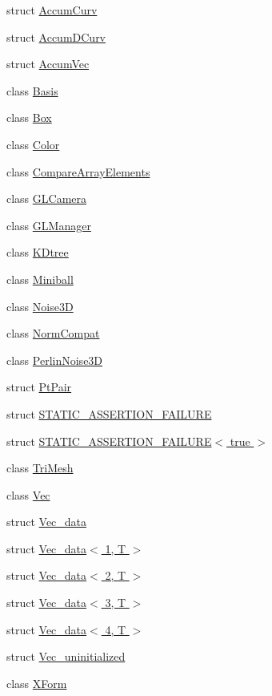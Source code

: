 \begin{DoxyCompactItemize}
\item 
struct \hyperlink{structtrimesh_1_1AccumCurv}{Accum\+Curv}
\item 
struct \hyperlink{structtrimesh_1_1AccumDCurv}{Accum\+D\+Curv}
\item 
struct \hyperlink{structtrimesh_1_1AccumVec}{Accum\+Vec}
\item 
class \hyperlink{classtrimesh_1_1Basis}{Basis}
\item 
class \hyperlink{classtrimesh_1_1Box}{Box}
\item 
class \hyperlink{classtrimesh_1_1Color}{Color}
\item 
class \hyperlink{classtrimesh_1_1CompareArrayElements}{Compare\+Array\+Elements}
\item 
class \hyperlink{classtrimesh_1_1GLCamera}{G\+L\+Camera}
\item 
class \hyperlink{classtrimesh_1_1GLManager}{G\+L\+Manager}
\item 
class \hyperlink{classtrimesh_1_1KDtree}{K\+Dtree}
\item 
class \hyperlink{classtrimesh_1_1Miniball}{Miniball}
\item 
class \hyperlink{classtrimesh_1_1Noise3D}{Noise3D}
\item 
class \hyperlink{classtrimesh_1_1NormCompat}{Norm\+Compat}
\item 
class \hyperlink{classtrimesh_1_1PerlinNoise3D}{Perlin\+Noise3D}
\item 
struct \hyperlink{structtrimesh_1_1PtPair}{Pt\+Pair}
\item 
struct \hyperlink{structtrimesh_1_1STATIC__ASSERTION__FAILURE}{S\+T\+A\+T\+I\+C\+\_\+\+A\+S\+S\+E\+R\+T\+I\+O\+N\+\_\+\+F\+A\+I\+L\+U\+RE}
\item 
struct \hyperlink{structtrimesh_1_1STATIC__ASSERTION__FAILURE_3_01true_01_4}{S\+T\+A\+T\+I\+C\+\_\+\+A\+S\+S\+E\+R\+T\+I\+O\+N\+\_\+\+F\+A\+I\+L\+U\+R\+E$<$ true $>$}
\item 
class \hyperlink{classtrimesh_1_1TriMesh}{Tri\+Mesh}
\item 
class \hyperlink{classtrimesh_1_1Vec}{Vec}
\item 
struct \hyperlink{structtrimesh_1_1Vec__data}{Vec\+\_\+data}
\item 
struct \hyperlink{structtrimesh_1_1Vec__data_3_011_00_01T_01_4}{Vec\+\_\+data$<$ 1, T $>$}
\item 
struct \hyperlink{structtrimesh_1_1Vec__data_3_012_00_01T_01_4}{Vec\+\_\+data$<$ 2, T $>$}
\item 
struct \hyperlink{structtrimesh_1_1Vec__data_3_013_00_01T_01_4}{Vec\+\_\+data$<$ 3, T $>$}
\item 
struct \hyperlink{structtrimesh_1_1Vec__data_3_014_00_01T_01_4}{Vec\+\_\+data$<$ 4, T $>$}
\item 
struct \hyperlink{structtrimesh_1_1Vec__uninitialized}{Vec\+\_\+uninitialized}
\item 
class \hyperlink{classtrimesh_1_1XForm}{X\+Form}
\end{DoxyCompactItemize}
